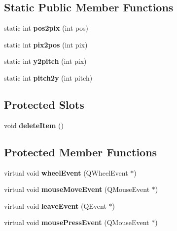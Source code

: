 \subsection*{Static Public Member Functions}
\begin{DoxyCompactItemize}
\item 
\mbox{\label{class_ms_1_1_chord_view_a9fbfe21be7442502452244ca0f211532}} 
static int {\bfseries pos2pix} (int pos)
\item 
\mbox{\label{class_ms_1_1_chord_view_a38df718aa52c951bb999061bfbba0eb2}} 
static int {\bfseries pix2pos} (int pix)
\item 
\mbox{\label{class_ms_1_1_chord_view_ad89fdafd8cef52e3ba4a9d447b948a85}} 
static int {\bfseries y2pitch} (int pix)
\item 
\mbox{\label{class_ms_1_1_chord_view_a668d6be774cf8be5dec1120fd8e1d819}} 
static int {\bfseries pitch2y} (int pitch)
\end{DoxyCompactItemize}
\subsection*{Protected Slots}
\begin{DoxyCompactItemize}
\item 
\mbox{\label{class_ms_1_1_chord_view_a2dbf20e2748eb41c11a3afdc7953b058}} 
void {\bfseries delete\+Item} ()
\end{DoxyCompactItemize}
\subsection*{Protected Member Functions}
\begin{DoxyCompactItemize}
\item 
\mbox{\label{class_ms_1_1_chord_view_a9e3c1570530cdb2a1fac5cf68eefbf3f}} 
virtual void {\bfseries wheel\+Event} (Q\+Wheel\+Event $\ast$)
\item 
\mbox{\label{class_ms_1_1_chord_view_ab0a36dd366142f109d91355a30359c16}} 
virtual void {\bfseries mouse\+Move\+Event} (Q\+Mouse\+Event $\ast$)
\item 
\mbox{\label{class_ms_1_1_chord_view_a05d4efb68f25bc433c4ef7e29ab07702}} 
virtual void {\bfseries leave\+Event} (Q\+Event $\ast$)
\item 
\mbox{\label{class_ms_1_1_chord_view_a8fbfa6bb2d9c5e300e3b34f092ec0363}} 
virtual void {\bfseries mouse\+Press\+Event} (Q\+Mouse\+Event $\ast$)
\end{DoxyCompactItemize}



